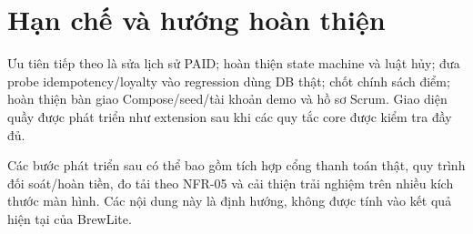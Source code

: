 \section{Hạn chế và hướng hoàn thiện}
Ưu tiên tiếp theo là sửa lịch sử PAID; hoàn thiện state machine và luật
hủy; đưa probe idempotency/loyalty vào regression dùng DB thật; chốt chính
sách điểm; hoàn thiện bàn giao Compose/seed/tài khoản demo và hồ sơ
Scrum. Giao diện quầy được phát triển như extension sau khi các quy tắc
core được kiểm tra đầy đủ.

Các bước phát triển sau có thể bao gồm tích hợp cổng thanh toán thật,
quy trình đối soát/hoàn tiền, đo tải theo NFR-05 và cải thiện trải nghiệm
trên nhiều kích thước màn hình. Các nội dung này là định hướng, không
được tính vào kết quả hiện tại của BrewLite.
